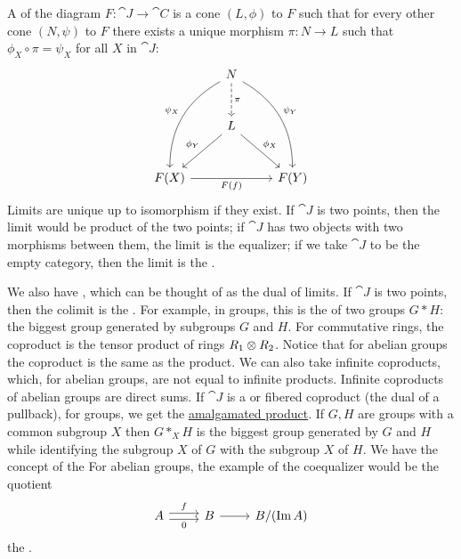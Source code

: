 \documentclass[11pt, twoside]{article}
\begin{document}
A \href{https://en.wikipedia.org/wiki/Limit_(category_theory)}{} of the diagram $F:\cat J\longrightarrow\cat C$ is a cone $(L,\phi)$ to $F$ such that for every other cone $(N,\psi)$ to $F$ there exists a unique morphism $\pi:N\longrightarrow L$ such that $\phi_X \circ \pi = \psi_X$ for all $X$ in $\cat J$:
 \[
\begin{tikzcd}[row sep = large]
& N \arrow[d, "\pi", dashed] \arrow[ddr, bend left,"\psi_Y"]   \arrow[ddl, bend right,"\psi_X",swap] & \\
& L\arrow[dr, "\phi_X"]  \arrow[dl,swap, "\phi_Y"] & \\
 F(X) \arrow[rr,swap, "F(f)"] & &  F(Y) 
\end{tikzcd}
\]
Limits are unique up to isomorphism if they exist. If $\cat J$ is two points, then the limit would be product of the two points; if $\cat J$ has two objects with two morphisms between them, the limit is the equalizer; if we take $\cat J$ to be the empty category, then the limit is the \href{https://en.wikipedia.org/wiki/Initial_and_terminal_objects}{}.

We also have \href{https://en.wikipedia.org/wiki/Limit_(category_theory)}{}, which can be thought of as the dual of limits. If $\cat J$ is two points, then the colimit is the \href{https://en.wikipedia.org/wiki/Coproduct}{}. For example, in groups, this is the \href{https://en.wikipedia.org/wiki/Free_product}{} of two groups $G*H$: the biggest group generated by subgroups $G$ and $H$. For commutative rings, the coproduct is the tensor product of rings $R_1\otimes R_2$. Notice that for abelian groups the coproduct is the same as the product. We can also take infinite coproducts, which, for abelian groups, are not equal to infinite products. Infinite coproducts of abelian groups are direct sums. If $\cat J$ is a \href{https://en.wikipedia.org/wiki/Pushout_(category_theory)}{} or fibered coproduct (the dual of a pullback), for groups, we get the \href{https://en.wikipedia.org/wiki/Free_product#Generalization:_Free_product_with_amalgamation}{\color{black}amalgamated product}. If $G,H$ are groups with a common subgroup $X$ then $G*_X H$ is the biggest group generated by $G$ and $H$ while identifying the subgroup $X$ of $G$ with the subgroup $X$ of $H$. We have the concept of the \href{https://en.wikipedia.org/wiki/Coequalizer}{} For abelian groups, the example of the coequalizer would be the quotient
\[
\begin{tikzcd}
A \arrow[r, shift left, "f"]\arrow[r, shift right, swap, "0"]& B\arrow[r] & B/(\Img A)
\end{tikzcd}
\] 
the \href{https://en.wikipedia.org/wiki/Cokernel}{}.
\end{document}
